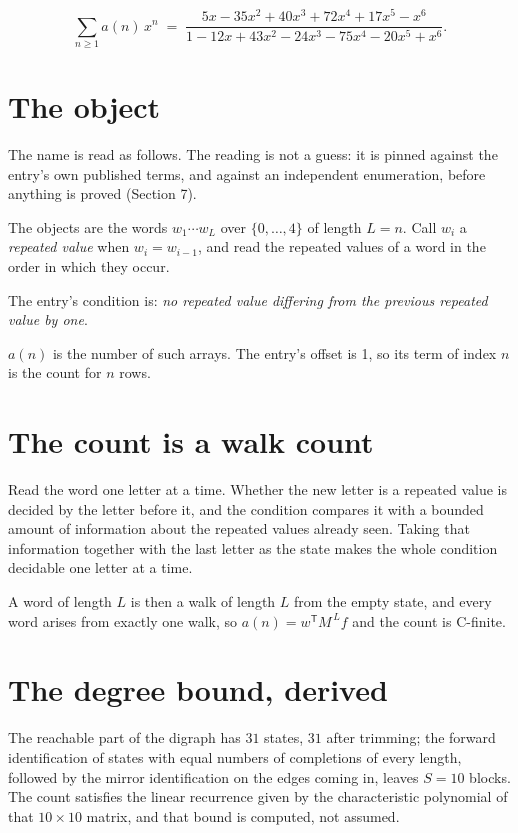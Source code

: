 \documentclass[11pt]{article}
\theoremstyle{definition}
\begin{document}
\[\sum_{n \ge 1} a(n)\,x^n \;=\; \frac{5x - 35x^{2} + 40x^{3} + 72x^{4} + 17x^{5} - x^{6}}{1 - 12x + 43x^{2} - 24x^{3} - 75x^{4} - 20x^{5} + x^{6}}.\]

\section{The object}

The name is read as follows. The reading is not a guess: it is pinned against the entry's own published terms, and against an independent enumeration, before anything is proved (Section 7).

The objects are the words $w_1\cdots w_L$ over $\{0,\dots,4\}$ of length $L = n$. Call $w_i$ a {\itshape repeated value} when $w_i = w_{i-1}$, and read the repeated values of a word in the order in which they occur.

The entry's condition is: {\itshape no repeated value differing from the previous repeated value by one}.

$a(n)$ is the number of such arrays. The entry's offset is 1, so its term of index $n$ is the count for $n$ rows.

\section{The count is a walk count}

Read the word one letter at a time. Whether the new letter is a repeated value is decided by the letter before it, and the condition compares it with a bounded amount of information about the repeated values already seen. Taking that information together with the last letter as the state makes the whole condition decidable one letter at a time.

A word of length $L$ is then a walk of length $L$ from the empty state, and every word arises from exactly one walk, so $a(n) = w^{\mathsf T}M^{\,L}f$ and the count is C-finite.

\section{The degree bound, derived}

The reachable part of the digraph has $31$ states, $31$ after trimming; the forward identification of states with equal numbers of completions of every length, followed by the mirror identification on the edges coming in, leaves $S = 10$ blocks. The count satisfies the linear recurrence given by the characteristic polynomial of that $10\times10$ matrix, and that bound is computed, not assumed.
\end{document}
